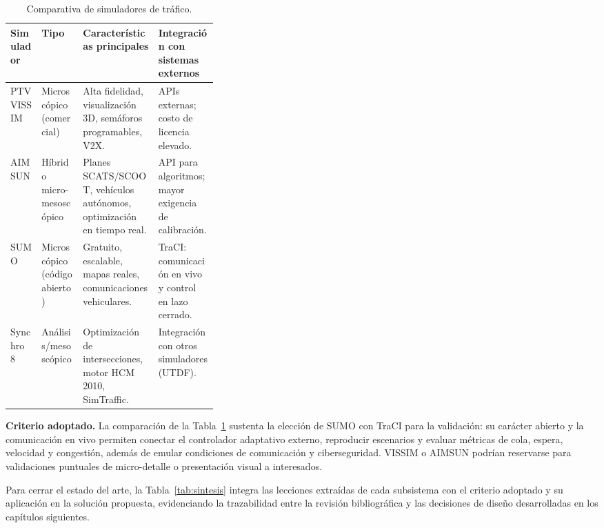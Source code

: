 \begin{table}[H]
  \centering
  \caption{Comparativa de simuladores de tráfico.}
  \label{tab:simuladores}
  \begin{tabularx}{\linewidth}{@{}>{\raggedright\arraybackslash}p{0.15\linewidth}>{\raggedright\arraybackslash}p{0.20\linewidth}XX@{}}
    \toprule
    \textbf{Simulador} & \textbf{Tipo} & \textbf{Características principales} & \textbf{Integración con sistemas externos} \\
    \midrule
    PTV VISSIM & Microscópico (comercial) & Alta fidelidad, visualización 3D, semáforos programables, V2X. & APIs externas; costo de licencia elevado. \\
    AIMSUN & Híbrido micro-mesoscópico & Planes SCATS/SCOOT, vehículos autónomos, optimización en tiempo real. & API para algoritmos; mayor exigencia de calibración. \\
    SUMO & Microscópico (código abierto) & Gratuito, escalable, mapas reales, comunicaciones vehiculares. & TraCI: comunicación en vivo y control en lazo cerrado. \\
    Synchro 8 & Análisis/mesoscópico & Optimización de intersecciones, motor HCM 2010, SimTraffic. & Integración con otros simuladores (UTDF). \\
    \bottomrule
  \end{tabularx}
\end{table}

\textbf{Criterio adoptado.} La comparación de la Tabla~\ref{tab:simuladores} sustenta la elección de SUMO con
TraCI para la validación: su carácter abierto y la comunicación en vivo permiten conectar el controlador
adaptativo externo, reproducir escenarios y evaluar métricas de cola, espera, velocidad y congestión, además
de emular condiciones de comunicación y ciberseguridad. VISSIM o AIMSUN podrían reservarse para validaciones
puntuales de micro-detalle o presentación visual a interesados.

Para cerrar el estado del arte, la Tabla~\ref{tab:sintesis} integra las lecciones extraídas de cada
subsistema con el criterio adoptado y su aplicación en la solución propuesta, evidenciando la trazabilidad
entre la revisión bibliográfica y las decisiones de diseño desarrolladas en los capítulos siguientes.

